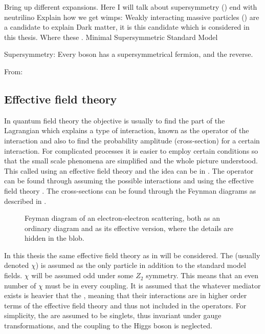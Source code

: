 Bring up different expansions. Here I will talk about supersymmetry (\abbrSUSY) end with neutrilino
Explain how we get wimps:
Weakly interacting massive particles (\abbrWIMPS) are a candidate to explain Dark matter, it is this candidate which is considered in this thesis. Where these 
\abbrWIMPS. 
Minimal Supersymmetric Standard Model

Supersymmetry: Every boson has a supersymmetrical fermion, and the reverse.

From: \citep{Jungman:1996,Martin:1998,Dine:1981,Pavel:2014}

\subsection{Effective field theory}
In quantum field theory the objective is usually to find the part of the Lagrangian which explains a type of interaction, known as the operator of the interaction and also to find the probability amplitude (cross-section) for a certain interaction. For complicated processes it is easier to employ certain conditions so that the small scale phenomena are simplified and the whole picture understood. This called using an effective field theory and the idea can be in . The operator can be found through assuming the possible interactions and using the effective field theory \citep{Zee:2003}. The cross-sections can be found through the Feynman diagrams as described in . 
 \begin{figure}[H] %
    \hfill
    \caption{Feyman diagram of an electron-electron scattering, both as an ordinary diagram and as its effective version, where the details are hidden in the blob.}
    \label{fig:feymanc}
  \end{figure}

In this thesis the same effective field theory as in \citep{82.116010,Goodman:2010} will be considered. The \abbrWIMP (usually denoted $\chi$) is assumed as the only particle in addition to the standard model fields. $\chi$ will be assumed odd under some $Z_2$ symmetry. This means that an even number of $\chi$ must be in every coupling. It is assumed that the whatever mediator exists is heavier that the \abbrWIMPS, meaning that their interactions are in higher order terms of the effective field theory and thus not included in the operators. For simplicity, the \abbrWIMPS are assumed to be \abbrSM singlets, thus invariant under \abbrSM gauge transformations, and the coupling to the Higgs boson is neglected.

